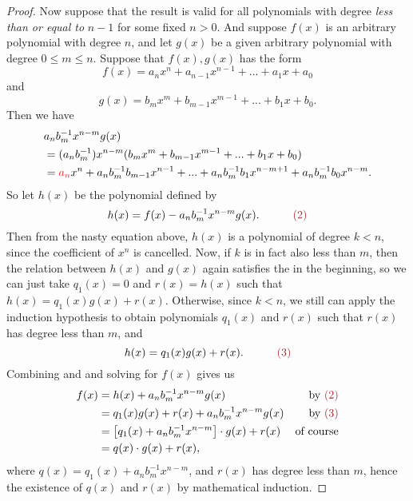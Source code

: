 \begin{proof}
Now suppose that the result is valid for all polynomials with degree \emph{less than or equal to} \(n - 1\) for some fixed \(n > 0\).
And suppose \(f(x)\) is an arbitrary polynomial with degree \(n\), and let \(g(x)\) be a given arbitrary polynomial with degree \(0 \le m \le n\).
Suppose that \(f(x), g(x)\) has the form
\[
    f(x) = a_n x^n + a_{n - 1} x^{n - 1} + ... + a_1 x + a_0
\]
and
\[
    g(x) = b_m x^m + b_{m - 1} x^{m - 1} + ... + b_1 x + b_0.
\]
Then we have
\begin{align*}
    & a_n b_m^{-1} x^{n - m} g(x) \\
    & = (a_n b_m^{-1}) x^{n - m} (b_m x^m + b_{m - 1} x^{m - 1} + ... + b_1 x + b_0) \\
    & = \RED{a_n} x^n + a_n b_m^{-1} b_{m - 1} x^{n - 1} + ... + a_n b_m^{-1} b_1 x^{n - m + 1} + a_n b_m^{-1} b_0 x^{n - m}.
\end{align*}
So let \(h(x)\) be the polynomial defined by
\[
    h(x) = f(x) - a_n b_m^{-1} x^{n - m} g(x). \quad \quad \quad \MAROON{(2)}
\]
Then from the nasty equation above, \(h(x)\) is a polynomial of degree \(k < n\), since the coefficient of \(x^n\) is cancelled.
Now, if \(k\) is in fact also less than \(m\), then the relation between \(h(x)\) and \(g(x)\) again satisfies the  in the beginning, so we can just take \(q_1(x) = 0\) and \(r(x) = h(x)\) such that \(h(x) = q_1(x)g(x) + r(x)\).
Otherwise, since \(k < n\), we still can apply the induction hypothesis to obtain polynomials \(q_1(x)\) and \(r(x)\) such that \(r(x)\) has degree less than \(m\), and
\[
    h(x) = q_1(x)g(x) + r(x). \quad \quad \quad \MAROON{(3)}
\]
Combining  and  and solving for \(f(x)\) gives us
\begin{align*}
    f(x) & = h(x) + a_n b_m^{-1} x^{n - m} g(x) & \text{by \MAROON{(2)}} \\
         & = q_1(x)g(x) + r(x) + a_n b_m^{-1} x^{n - m} g(x) & \text{by \MAROON{(3)}} \\
         & = \left[ q_1(x) + a_n b_m^{-1} x^{n - m} \right] \cdot g(x) + r(x) & \text{of course} \\
         & = q(x) \cdot g(x) + r(x),
\end{align*}
where \(q(x) = q_1(x) + a_n b_m^{-1} x^{n - m}\), and \(r(x)\) has degree less than \(m\), hence the existence of \(q(x)\) and \(r(x)\) by mathematical induction.


\end{proof}
